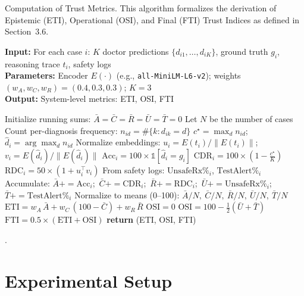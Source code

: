 \documentclass[letterpaper]{article} %
\begin{document}
\begin{algorithm}[t]
\caption{Computation of Trust Metrics. 
This algorithm formalizes the derivation of Epistemic (ETI), Operational (OSI), and Final (FTI) Trust Indices as defined in Section~3.6.}
\label{alg:trustmetrics}
\textbf{Input:} For each case $i$: $K$ doctor predictions $\{d_{i1},\dots,d_{iK}\}$, ground truth $g_i$, reasoning trace $t_i$, safety logs\\
\textbf{Parameters:} Encoder $E(\cdot)$ (e.g., \texttt{all-MiniLM-L6-v2}); weights $(w_A,w_C,w_R)=(0.4,0.3,0.3)$; $K{=}3$\\
\textbf{Output:} System-level metrics: ETI, OSI, FTI
\begin{algorithmic}[1]
\STATE Initialize running sums: $\bar{A}=\bar{C}=\bar{R}=\bar{U}=\bar{T}=0$
\STATE Let $N$ be the number of cases
    \STATE Count per-diagnosis frequency: $n_{id}=\#\{k : d_{ik}=d\}$
    \STATE $c^\star = \max_d n_{id}$;\quad $\hat{d}_i = \arg\max_d n_{id}$ 
    \STATE Normalize embeddings: $u_i=E(t_i)/\|E(t_i)\|$;\quad $v_i=E(\hat{d}_i)/\|E(\hat{d}_i)\|$
    \STATE $\mathrm{Acc}_i = 100 \times \mathbb{1}[\hat{d}_i=g_i]$
    \STATE $\mathrm{CDR}_i = 100 \times \left(1 - \frac{c^\star}{K}\right)$ 
    \STATE $\mathrm{RDC}_i = 50 \times (1 + u_i^\top v_i)$ 
    \STATE From safety logs: $\mathrm{UnsafeRx\%}_i$, $\mathrm{TestAlert\%}_i$
    \STATE Accumulate: $\bar{A}{+}{=}\mathrm{Acc}_i$;\ $\bar{C}{+}{=}\mathrm{CDR}_i$;\ $\bar{R}{+}{=}\mathrm{RDC}_i$;\ 
    $\bar{U}{+}{=}\mathrm{UnsafeRx\%}_i$;\ $\bar{T}{+}{=}\mathrm{TestAlert\%}_i$
\ENDFOR
\STATE Normalize to means (0--100): $\bar{A}/N,\ \bar{C}/N,\ \bar{R}/N,\ \bar{U}/N,\ \bar{T}/N$
\STATE $\mathrm{ETI} = w_A\,\bar{A} + w_C\,(100{-}\bar{C}) + w_R\,\bar{R}$
\IF{ safety agents inactive }
    \STATE $\mathrm{OSI} = 0$
\ELSE
    \STATE $\mathrm{OSI} = 100 - \tfrac{1}{2}(\bar{U} + \bar{T})$
\ENDIF
\STATE $\mathrm{FTI} = 0.5 \times (\mathrm{ETI} + \mathrm{OSI})$
\STATE \textbf{return} (ETI, OSI, FTI)
\end{algorithmic}
\end{algorithm}







.

\section{Experimental Setup}
\label{sec:setup}
\end{document}
